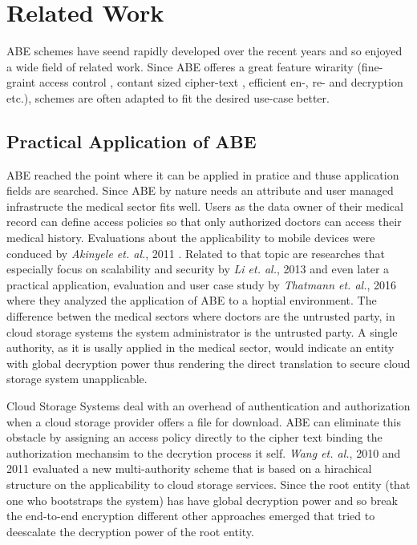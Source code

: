 \chapter{Related Work}
ABE schemes have seend rapidly developed over the recent years and so enjoyed a wide field of related work. Since ABE offeres a great feature wirarity (fine-graint access control \cite{goyal2006attribute}, contant sized cipher-text \cite{li2017two}, efficient en-, re- and decryption \cite{yang2013dac} etc.), schemes are often adapted to fit the desired use-case better. 

\section{Practical Application of ABE}
ABE reached the point where it can be applied in pratice and thuse application fields are searched. Since ABE by nature needs an attribute and user managed infrastructe the medical sector fits well. Users as the data owner of their medical record can define access policies so that only authorized doctors can access their medical history. Evaluations about the applicability to mobile devices were conduced by \textit{Akinyele et. al.}, 2011 \cite{akinyele2011securing}. Related to that topic are researches that especially focus on scalability and security by \textit{Li et. al.}, 2013 \cite{li2013scalable} and even later a practical application, evaluation and user case study by \textit{Thatmann et. al.}, 2016 \cite{thatmann2016please} where they analyzed the application of ABE to a hoptial environment. The difference betwen the medical sectors where doctors are the untrusted party, in cloud storage systems the system administrator is the untrusted party. A single authority, as it is usally applied in the medical sector, would indicate an entity with global decryption power thus rendering the direct translation to secure cloud storage system unapplicable.   

Cloud Storage Systems deal with an overhead of authentication and authorization when a cloud storage provider offers a file for download. ABE can eliminate this obstacle by assigning an access policy directly to the cipher text binding the authorization mechansim to the decrytion process it self. \textit{Wang et. al.}, 2010 \cite{Wang:2010:HAE:1866307.1866414} and 2011 \cite{wang2011hierarchical} evaluated a new multi-authority scheme that is based on a hirachical structure on the applicability to cloud storage services. Since the root entity (that one who bootstraps the system) has have global decryption power and so break the end-to-end encryption different other approaches emerged that tried to deescalate the decryption power of the root entity. 

